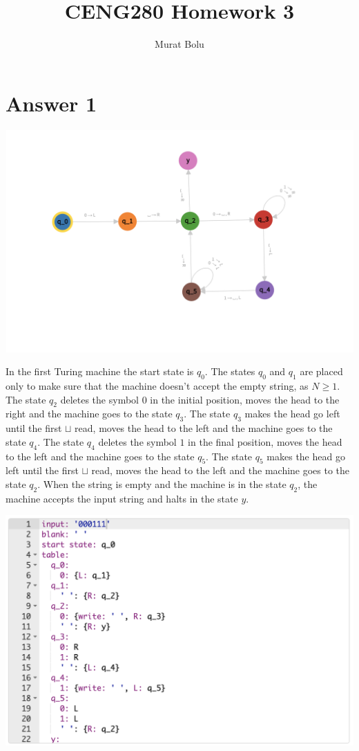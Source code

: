 \documentclass[a4paper]{article}
\title{CENG280 Homework 3}
\author{Murat Bolu}
\begin{document}
\maketitle

\section*{Answer 1}

\includegraphics[width=\textwidth]{TM1.1}

In the first Turing machine the start state is $q_0$.
The states $q_0$ and $q_1$ are placed only to make sure that the machine doesn't accept the empty string, as $N \geq 1$.
The state $q_2$ deletes the symbol $0$ in the initial position, moves the head to the right and the machine goes to the state $q_3$.
The state $q_3$ makes the head go left until the first $\sqcup$ read, moves the head to the left and the machine goes to the state $q_4$.
The state $q_4$ deletes the symbol $1$ in the final position, moves the head to the left and the machine goes to the state $q_5$.
The state $q_5$ makes the head go left until the first $\sqcup$ read, moves the head to the left and the machine goes to the state $q_2$.
When the string is empty and the machine is in the state $q_2$, the machine accepts the input string and halts in the state $y$.

\includegraphics[width=\textwidth]{TM1.2}
\end{document}
